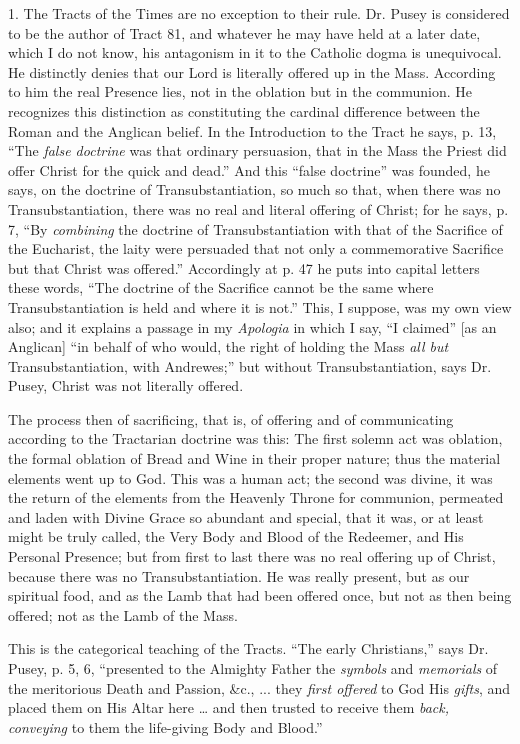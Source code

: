 1. The Tracts of the Times are no exception to their rule. Dr.
Pusey is considered to be the author of Tract 81, and whatever he may
have held at a later date, which I do not know, his antagonism in it
to the Catholic dogma is unequivocal. He distinctly denies that our
Lord is literally offered up in the Mass. According to him the real
Presence lies, not in the oblation but in the communion. He recognizes
this distinction as constituting the cardinal difference between the
Roman and the Anglican belief. In the Introduction to the Tract he
says, p. 13, ``The \emph{false doctrine} was that ordinary
persuasion, that in the Mass the Priest did offer Christ for the quick
and dead.'' And this ``false doctrine'' was founded, he
says, on the doctrine of Transubstantiation, so much so that, when
there was no Transubstantiation, there was no real and literal
offering of Christ; for he says, p. 7, ``By \emph{combining} the
doctrine of Transubstantiation with that of the Sacrifice of the
Eucharist, the laity were persuaded that not only a commemorative
Sacrifice but that Christ was offered.'' Accordingly at p.
47 he puts into capital letters these words, ``The doctrine of the
Sacrifice cannot be the same where Transubstantiation is held and
where it is not.'' This, I suppose, was my own view also; and it
explains a passage in my \emph{Apologia} in which I say, ``I
claimed'' [as an Anglican] ``in behalf of who would, the right
of holding the Mass \emph{all but} Transubstantiation, with Andrewes;''
but without Transubstantiation, says Dr. Pusey, Christ was not
literally offered.

The process then of sacrificing, that is, of offering and of
communicating according to the Tractarian doctrine was this: The first
solemn act was oblation, the formal oblation of Bread and Wine in
their proper nature; thus the material elements went up to God. This
was a human act; the second was divine, it was the return of the
elements from the Heavenly Throne for communion, permeated and laden
with Divine Grace so abundant and special, that it was, or at least
might be truly called, the Very Body and Blood of the Redeemer, and
His Personal Presence; but from first to last there was no real
offering up of Christ, because there was no Transubstantiation. He was
really present, but as our spiritual food, and as the Lamb that had
been offered once, but not as then being offered; not as the Lamb of
the Mass.

This is the categorical teaching of the Tracts. ``The early
Christians,'' says Dr. Pusey, p. 5, 6, ``presented to the
Almighty Father the \emph{symbols} and \emph{memorials} of the
meritorious Death and Passion, \&c., ... they \emph{first offered}
to God His \emph{gifts}, and placed them on His Altar here … and
then trusted to receive them \emph{back, conveying} to them the
life-giving Body and Blood.''

